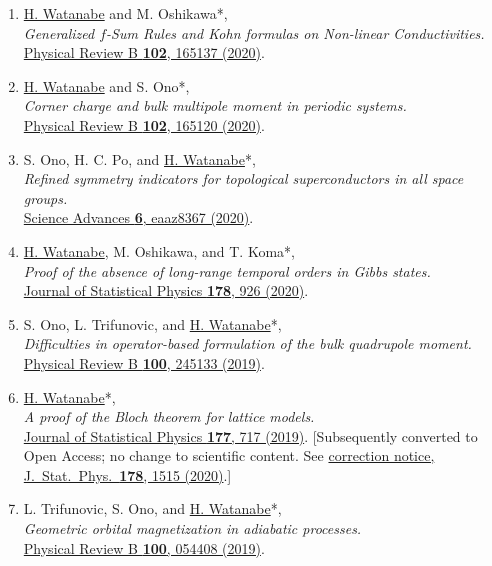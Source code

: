 \documentclass[letterpaper,11pt]{article}
\begin{document}
\begin{enumerate}
\item \underline{H. Watanabe} and M. Oshikawa*, \\\emph{Generalized $f$-Sum Rules and Kohn formulas on Non-linear Conductivities.}\\{\href{https://doi.org/10.1103/PhysRevB.102.165137}{Physical Review B {\bf 102}, 165137 (2020)}.}

\item \underline{H. Watanabe} and S. Ono*, \\\emph{Corner charge and bulk multipole moment in periodic systems.}\\{\href{https://doi.org/10.1103/PhysRevB.102.165120}{Physical Review B {\bf 102}, 165120 (2020)}.}

\item S. Ono, H. C. Po, and \underline{H. Watanabe}*, \\\emph{Refined symmetry indicators for topological superconductors in all space groups.}\\{\href{https://doi.org/10.1126/sciadv.aaz8367}{Science Advances {\bf 6}, eaaz8367 (2020)}.}

\item \underline{H. Watanabe}, M. Oshikawa,  and T. Koma*, \\\emph{Proof of the absence of long-range temporal orders in Gibbs states.}\\{\href{https://doi.org/10.1007/s10955-019-02471-5}{Journal of Statistical Physics {\bf 178}, 926 (2020)}.}

\item S. Ono, L. Trifunovic, and \underline{H. Watanabe}*, \\\emph{Difficulties in operator-based formulation of the bulk quadrupole moment.}\\{\href{https://doi.org/10.1103/PhysRevB.100.245133}{Physical Review B {\bf 100}, 245133 (2019)}.}

\item \underline{H. Watanabe}*, \\\emph{A proof of the Bloch theorem for lattice models.}\\{\href{https://doi.org/10.1007/s10955-019-02386-1}{Journal of Statistical Physics {\bf 177}, 717 (2019)}.} {\small \textcolor[gray]{0.4}{[Subsequently converted to Open Access; no change to scientific content. See \href{https://doi.org/10.1007/s10955-020-02502-6}{correction notice, J.\ Stat.\ Phys.\ {\bf 178}, 1515 (2020)}.]}}

\item L. Trifunovic, S. Ono, and \underline{H. Watanabe}*, \\\emph{Geometric orbital magnetization in adiabatic processes.}\\{\href{https://doi.org/10.1103/PhysRevB.100.054408}{Physical Review B {\bf 100}, 054408 (2019)}.}


\end{enumerate}
\end{document}
